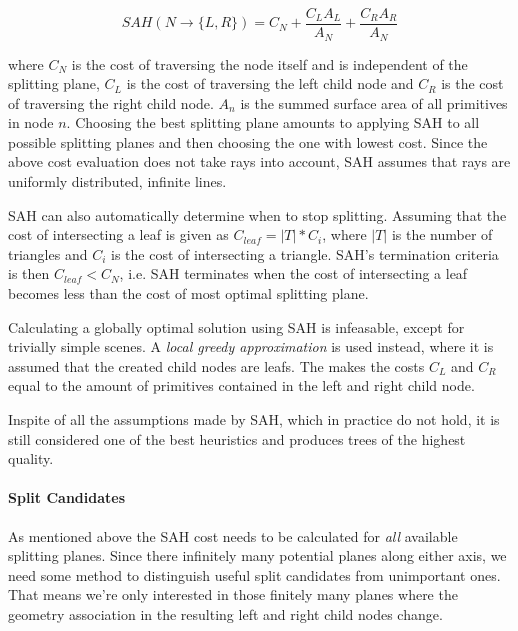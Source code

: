 \begin{displaymath}
  SAH(N \rightarrow \{L, R\}) = C_N + \frac{C_L A_L}{A_N} +
  \frac{C_R A_R}{A_N}
\end{displaymath}

where $C_N$ is the cost of traversing the node itself and is
independent of the splitting plane, $C_L$ is the cost of traversing
the left child node and $C_R$ is the cost of traversing the right
child node. $A_n$ is the summed surface area of all primitives in node
$n$. Choosing the best splitting plane amounts to applying SAH to all
possible splitting planes and then choosing the one with lowest
cost. Since the above cost evaluation does not take rays into account,
SAH assumes that rays are uniformly distributed, infinite lines.

SAH can also automatically determine when to stop splitting. Assuming
that the cost of intersecting a leaf is given as $C_{leaf} = |T| *
C_i$, where $|T|$ is the number of triangles and $C_i$ is the cost of
intersecting a triangle. SAH's termination criteria is then $C_{leaf}
< C_N$, i.e. SAH terminates when the cost of intersecting a leaf
becomes less than the cost of most optimal splitting plane.


Calculating a globally optimal solution using SAH is infeasable,
except for trivially simple scenes. A \textit{local greedy
  approximation} is used instead, where it is assumed that the created
child nodes are leafs. The makes the costs $C_L$ and $C_R$ equal to
the amount of primitives contained in the left and right child node.

Inspite of all the assumptions made by SAH, which in practice do not
hold, it is still considered one of the best heuristics and produces
trees of the highest quality.



\paragraph{Split Candidates}


As mentioned above the SAH cost needs to be calculated for
\textit{all} available splitting planes. Since there infinitely many
potential planes along either axis, we need some method to distinguish
useful split candidates from unimportant ones. That means we're only
interested in those finitely many planes where the geometry
association in the resulting left and right child nodes change.

